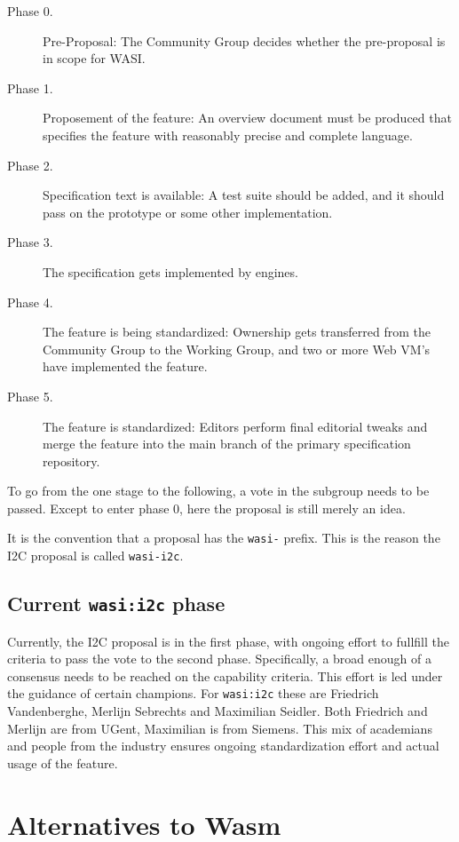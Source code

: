 \begin{description}
    \item[Phase 0.] Pre-Proposal: The Community Group decides whether the pre-proposal is in scope for \gls{WASI}.
    \item[Phase 1.] Proposement of the feature: An overview document must be produced that specifies the feature with reasonably precise and complete language.
    \item[Phase 2.] Specification text is available: A test suite should be added, and it should pass on the prototype or some other implementation.
    \item[Phase 3.] The specification gets implemented by engines.
    \item[Phase 4.] The feature is being standardized: Ownership gets transferred from the Community Group to the Working Group, and two or more Web \gls{VM}'s have implemented the feature.
    \item[Phase 5.] The feature is standardized: Editors perform final editorial tweaks and merge the feature into the main branch of the primary specification repository.

\end{description}

To go from the one stage to the following, a vote in the subgroup needs to be passed. Except to enter phase 0, here the proposal is still merely an idea.

It is the convention that a proposal has the \texttt{wasi-} prefix. This is the reason the \gls{I2C} proposal is called \texttt{wasi-i2c}.

\subsection{Current \texttt{wasi:i2c} phase}

Currently, the \gls{I2C} proposal is in the first phase, with ongoing effort to fullfill the criteria to pass the vote to the second phase. Specifically, a broad enough of a consensus needs to be reached on the capability criteria. This effort is led under the guidance of certain champions. For \texttt{wasi:i2c} these are Friedrich Vandenberghe, Merlijn Sebrechts and Maximilian Seidler. Both Friedrich and Merlijn are from UGent, Maximilian is from Siemens. This mix of academians and people from the industry ensures ongoing standardization effort and actual usage of the feature.

\section{Alternatives to Wasm}

